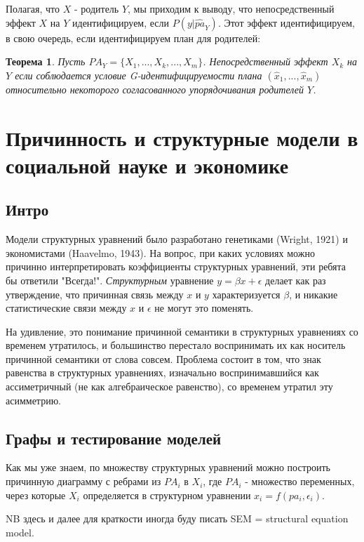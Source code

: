 \documentclass[fleqn]{article}
\newtheorem{theorem}{Теорема}
\numberwithin{equation}{section}
\numberwithin{theorem}{section}
\numberwithin{figure}{section}
\numberwithin{lemma}{section}
\numberwithin{corollary}{section}
\begin{document}
Полагая, что $X$ - родитель $Y$, мы приходим к выводу, что непосредственный эффект $X$ на $Y$ идентифицируем, если $P(y|\hat{pa}_Y)$. Этот эффект идентифицируем,  в свою очередь, если идентифицируем план для родителей:

\begin{theorem}
	Пусть $PA_Y = \{X_1,...,X_k,...,X_m\}$. Непосредственный эффект $X_k$ на $Y$ если соблюдается условие G-идентифицируемости плана $(\hat x_1,...,\hat x_m)$ относительно некоторого согласованного упорядочивания родителей $Y$. 
\end{theorem}

\section{Причинность и структурные модели в социальной науке и экономике}

\subsection*{Интро}

Модели структурных уравнений было разработано генетиками (Wright, 1921) и экономистами (Haavelmo, 1943). На вопрос, при каких условиях можно причинно интерпретировать коэффициенты структурных уравнений, эти ребята бы ответили "Всегда!".  \textit{Структурным} уравнение $y = \beta x + \epsilon$  делает как раз утверждение, что причинная связь между $x$ и $y$ характеризуется $\beta$, и никакие статистические связи между $x$ и $\epsilon$ не могут это поменять. 

На удивление, это понимание причинной семантики в структурных уравнениях со временем утратилось, и большинство перестало воспринимать их как носитель причинной семантики от слова совсем. Проблема состоит в том, что знак равенства в структурных уравнениях, изначально воспринимавшийся как ассиметричный (не как алгебраическое равенство), со временем утратил эту асимметрию. 

\subsection*{Графы и тестирование моделей}

Как мы уже знаем, по множеству структурных уравнений можно построить причинную диаграмму с ребрами из $PA_i$ в $X_i$, где $PA_i$ - множество переменных, через которые $X_i$ определяется в структурном уравнении $x_i = f(pa_i, \epsilon_i)$. 

NB здесь и далее для краткости  иногда буду писать SEM = structural equation model.
\end{document}
